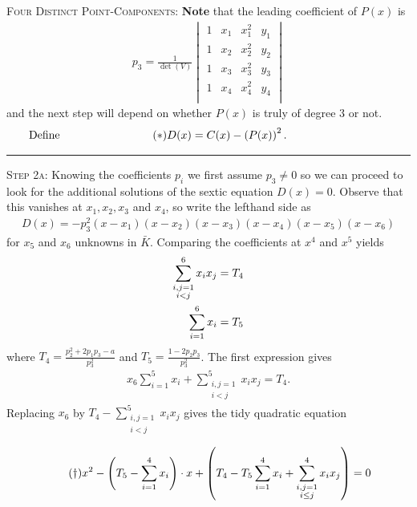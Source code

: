 \documentclass[english,11pt,a4paper]{article}
\begin{document}
\begin{case} {\scshape Four Distinct Point-Components:}
  \textbf{Note} that the leading coefficient of $P(x)$ is
  \begin{align*}
    p_3 = \frac{1}{\det (V)}
    \begin{vmatrix}
      1 & x_1 & x_1^2 & y_1\\
      1 & x_2 & x_2^2 & y_2\\
      1 & x_3 & x_3^2 & y_3\\
      1 & x_4 & x_4^2 & y_4\\   
    \end{vmatrix}
  \end{align*}
  and the next step will depend on whether $P(x)$ is truly of degree 3 or not.\vspace{-1mm}
\fline
\vspace{-2.5mm}
  \begin{align*}\tag{$\ast$} \label{sex}
    \rlap{\hspace{-44.5mm} Define}
    D(x) = C(x)-\left ( P(x) \right )^2.
  \end{align*}\vspace{-5mm}
  \hrule

  {\scshape Step 2a:} Knowing the coefficients $p_i$ we first assume $p_3 \neq 0$ so we can proceed to look for the additional solutions of the sextic equation $D(x) = 0$.
  Observe that this vanishes at $x_1, x_2, x_3$ and $x_4$, so write the lefthand side as
  \begin{align}\tag{$*_1$}
    D(x) = -p_3^2(x-x_1)(x-x_2)(x-x_3)(x-x_4)(x-x_5)(x-x_6)
  \end{align}
   for $x_5$ and $x_6$ unknowns in $\bar K$. Comparing the coefficients at $x^4$ and $x^5$ yields
  \begin{align*}
    \sum_{\substack{i,j=1\\i<j}}^6 x_i x_j &= T_4\\
    \rlap{\hspace{-56mm}and} \sum_{i=1}^6 x_i &= T_5
  \end{align*}
  where $T_4 = \frac{p_2^2+2 p_1 p_3-a}{p_3^2}$ and $T_5 = \frac{1-2 p_2 p_3}{p_3^2}$.
  The first expression gives
  \begin{align*}
    x_6 \sum_{i=1}^5 x_i + \sum_{\substack{i,j=1\\i<j}}^5 x_i x_j = T_4.
  \end{align*}
  Replacing $x_6$ by $T_4 - \sum_{\substack{i,j=1\\i<j}}^5 x_i x_j$ gives the tidy quadratic equation

  \vspace{-2mm}
  \fline
  \begin{align*}
    \tag{$\dag$} \label{dagger} x^2 - \left(T_5 - \sum_{i=1}^4 x_i \right) \cdot x+ \left(T_4 - T_5 \sum_{i=1}^4 x_i + \sum_{\substack{i,j=1\\i\leq j}}^4 x_i x_j \right) = 0
  \end{align*}
  \fline


\end{case}
\end{document}

